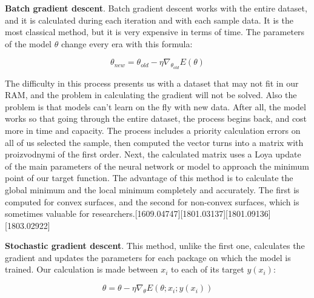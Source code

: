 \vspace{-0.3cm}

\noindent \textbf{Batch gradient descent}. Batch gradient descent works with the entire dataset, and it is calculated during each iteration and with each sample data. It is the most classical method, but it is very expensive in terms of time. The parameters of the model $\theta$ change every era with this formula:


\begin{equation}
	\theta_{new} = \theta_{old} - \eta\nabla_\theta_{old}E(\theta)
\end{equation}

\noindent The difficulty in this process presents us with a dataset that may not fit in our RAM, and the problem in calculating the gradient will not be solved. Also the problem is that models can't learn on the fly with new data. After all, the model works so that going through the entire dataset, the process begins back, and cost more in time and capacity. The process includes a priority calculation errors on all of us selected the sample, then computed the vector turns into a matrix with proizvodnymi of the first order. Next, the calculated matrix uses a Loya update of the main parameters of the neural network or model to approach the minimum point of our target function. The advantage of this method is to calculate the global minimum and the local minimum completely and accurately. The first is computed for convex surfaces, and the second for non-convex surfaces, which is sometimes valuable for researchers.[1609.04747][1801.03137][1801.09136][1803.02922]

\noindent \textbf{Stochastic gradient descent}. This method, unlike the first one, calculates the gradient and updates the parameters for each package on which the model is trained. Our calculation is made between $x_i$ to each of its target $y(x_i)$:

\begin{equation}
	\theta = \theta- {\eta}{\nabla_\theta}E(\theta;x_i;y(x_i))
\end{equation}


